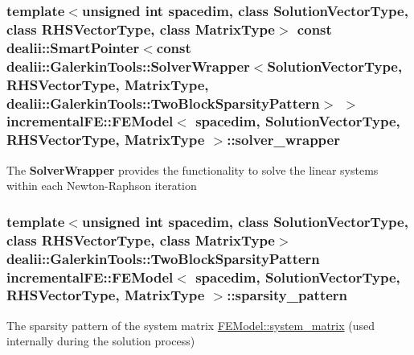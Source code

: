 \subsubsection[{\texorpdfstring{solver\+\_\+wrapper}{solver_wrapper}}]{\setlength{\rightskip}{0pt plus 5cm}template$<$unsigned int spacedim, class Solution\+Vector\+Type, class R\+H\+S\+Vector\+Type, class Matrix\+Type$>$ const dealii\+::\+Smart\+Pointer$<$const dealii\+::\+Galerkin\+Tools\+::\+Solver\+Wrapper$<$Solution\+Vector\+Type, R\+H\+S\+Vector\+Type, Matrix\+Type, dealii\+::\+Galerkin\+Tools\+::\+Two\+Block\+Sparsity\+Pattern$>$ $>$ {\bf incremental\+F\+E\+::\+F\+E\+Model}$<$ spacedim, Solution\+Vector\+Type, R\+H\+S\+Vector\+Type, Matrix\+Type $>$\+::solver\+\_\+wrapper\hspace{0.3cm}{\ttfamily [private]}}\hypertarget{classincremental_f_e_1_1_f_e_model_a609de66ca9623d737bf3a45a37bb7690}{}\label{classincremental_f_e_1_1_f_e_model_a609de66ca9623d737bf3a45a37bb7690}
The {\bf Solver\+Wrapper} provides the functionality to solve the linear systems within each Newton-\/\+Raphson iteration 
\subsubsection[{\texorpdfstring{sparsity\+\_\+pattern}{sparsity_pattern}}]{\setlength{\rightskip}{0pt plus 5cm}template$<$unsigned int spacedim, class Solution\+Vector\+Type, class R\+H\+S\+Vector\+Type, class Matrix\+Type$>$ dealii\+::\+Galerkin\+Tools\+::\+Two\+Block\+Sparsity\+Pattern {\bf incremental\+F\+E\+::\+F\+E\+Model}$<$ spacedim, Solution\+Vector\+Type, R\+H\+S\+Vector\+Type, Matrix\+Type $>$\+::sparsity\+\_\+pattern\hspace{0.3cm}{\ttfamily [private]}}\hypertarget{classincremental_f_e_1_1_f_e_model_ac5c04f79916df3cc38ac64209051eecd}{}\label{classincremental_f_e_1_1_f_e_model_ac5c04f79916df3cc38ac64209051eecd}
The sparsity pattern of the system matrix \hyperlink{classincremental_f_e_1_1_f_e_model_abc07b7d142d78230bcd55274f35514b3}{F\+E\+Model\+::system\+\_\+matrix} (used internally during the solution process) 
